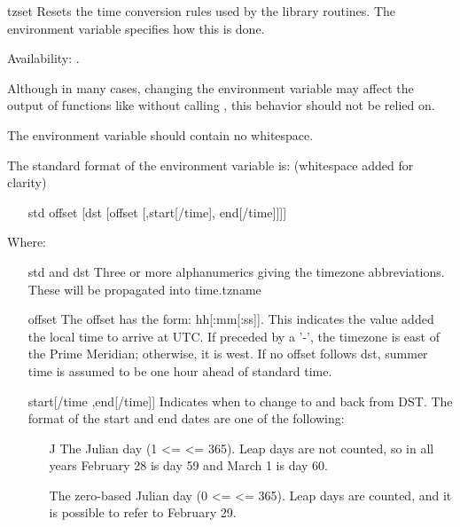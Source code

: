 \begin{funcdesc}{tzset}{}
Resets the time conversion rules used by the library routines.
The environment variable  specifies how this is done.

Availability: \UNIX.

\begin{notice}
Although in many cases, changing the  environment variable
may affect the output of functions like  without calling 
, this behavior should not be relied on.

The  environment variable should contain no whitespace.
\end{notice}

The standard format of the  environment variable is:
(whitespace added for clarity)
\begin{itemize}
    \item[std offset [dst [offset] [,start[/time], end[/time]]]]
\end{itemize}

Where:

\begin{itemize}
  \item[std and dst]
    Three or more alphanumerics giving the timezone abbreviations.
    These will be propagated into time.tzname

  \item[offset]
    The offset has the form: \plusminus{} hh[:mm[:ss]].
    This indicates the value added the local time to arrive at UTC. 
    If preceded by a '-', the timezone is east of the Prime 
    Meridian; otherwise, it is west. If no offset follows
    dst, summer time is assumed to be one hour ahead of standard time.

  \item[start[/time],end[/time]]
    Indicates when to change to and back from DST. The format of the
    start and end dates are one of the following:

    \begin{itemize}
      \item[J\var{n}]
        The Julian day  (1 <=  <= 365). Leap days are not 
        counted, so in all years February 28 is day 59 and
        March 1 is day 60.

    \item[\var{n}]
        The zero-based Julian day (0 <=  <= 365). Leap days are
        counted, and it is possible to refer to February 29.


\end{itemize}
\end{itemize}
\end{funcdesc}
